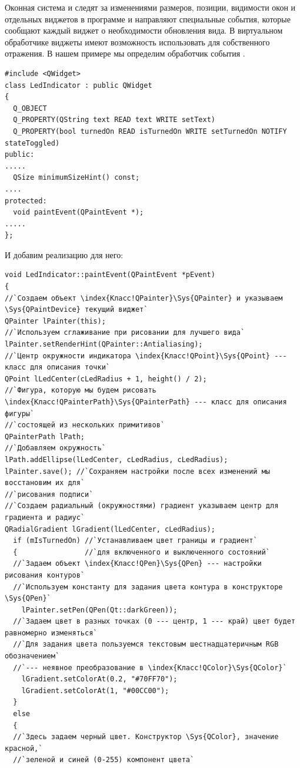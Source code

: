 Оконная система и  следят за изменениями размеров, позиции, видимости окон и отдельных виджетов в программе и
направляют специальные события, которые сообщают каждый виджет о необходимости обновления вида. В виртуальном
обработчике  виджеты имеют возможность использовать  для
собственного отражения. В нашем примере мы определим обработчик события
.
\begin{lstlisting}
#include <QWidget>
class LedIndicator : public QWidget
{
  Q_OBJECT
  Q_PROPERTY(QString text READ text WRITE setText)
  Q_PROPERTY(bool turnedOn READ isTurnedOn WRITE setTurnedOn NOTIFY stateToggled)
public:
.....
  QSize minimumSizeHint() const;
....
protected:
  void paintEvent(QPaintEvent *);
.....
};
\end{lstlisting}
И добавим реализацию для него:
\begin{lstlisting}
void LedIndicator::paintEvent(QPaintEvent *pEvent)
{
//`Создаем объект \index{Класс!QPainter}\Sys{QPainter} и указываем \Sys{QPaintDevice} текущий виджет`
QPainter lPainter(this);
//`Используем сглаживание при рисовании для лучшего вида`
lPainter.setRenderHint(QPainter::Antialiasing);
//`Центр окружности индикатора \index{Класс!QPoint}\Sys{QPoint} --- класс для описания точки`
QPoint lLedCenter(cLedRadius + 1, height() / 2);
//`Фигура, которую мы будем рисовать \index{Класс!QPainterPath}\Sys{QPainterPath} --- класс для описания фигуры`
//`состоящей из нескольких примитивов`
QPainterPath lPath;
//`Добавляем окружность`
lPath.addEllipse(lLedCenter, cLedRadius, cLedRadius);
lPainter.save(); //`Сохраняем настройки после всех изменений мы восстановим их для`
//`рисования подписи`
//`Создаем радиальный (окружностями) градиент указываем центр для градиента и радиус`
QRadialGradient lGradient(lLedCenter, cLedRadius);
  if (mIsTurnedOn) //`Устанавливаем цвет границы и градиент`
  {                //`для включенного и выключенного состояний`
  //`Задаем объект \index{Класс!QPen}\Sys{QPen} --- настройки рисования контуров`
  //`Используем константу для задания цвета контура в конструкторе \Sys{QPen}`
    lPainter.setPen(QPen(Qt::darkGreen));
  //`Задаем цвет в разных точках (0 --- центр, 1 --- край) цвет будет равномерно изменяться`
  //`Для задания цвета пользуемся текстовым шестнадцатеричным RGB обозначением`
  //`--- неявное преобразование в \index{Класс!QColor}\Sys{QColor}`
    lGradient.setColorAt(0.2, "#70FF70");
    lGradient.setColorAt(1, "#00CC00");
  }
  else
  {
  //`Здесь задаем черный цвет. Конструктор \Sys{QColor}, значение красной,`
  //`зеленой и синей (0-255) компонент цвета`

\end{lstlisting}
